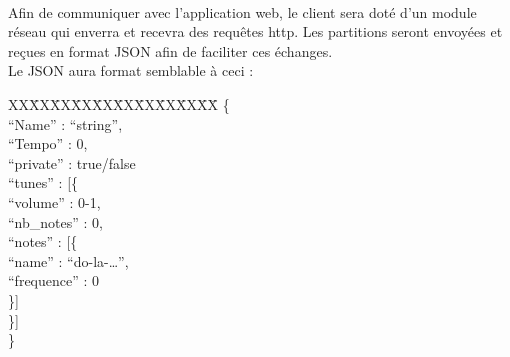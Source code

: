 \paragraph{}
	Afin de communiquer avec l'application web, le client sera doté d'un module réseau qui enverra et 		
	recevra des requêtes http. Les partitions seront envoyées et reçues en format JSON afin de faciliter 
	ces échanges. \\
	Le JSON aura format semblable à ceci :
	
		\begin{tabbing}
		\kill XX\=XX\=XX\=XX\=XX\=XX\=XX\=XX\=XX\=XX\=
		\kill
			\{ \\
				\>“Name” : “string”, \\
				\>“Tempo” : 0, \\
				\>“private” : true/false \\
				\>“tunes” : [\{ \\
					\>\>“volume” : 0-1, \\
					\>\>“nb\_notes” : 0, \\
					\>\>“notes” : [\{ \\
						\>\>\>“name” : “do-la-…”, \\
						\>\>\>“frequence” : 0 \\
					\>\>\}] \\
				\>\}]	 \\
			\}
		\end{tabbing}